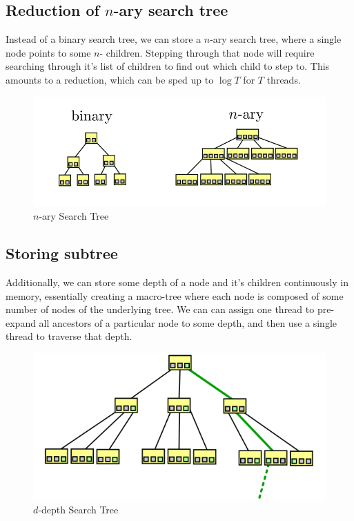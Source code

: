 \subsection{Reduction of $n$-ary search tree}
Instead of a binary search tree, we can store a $n$-ary search tree, where a single node points to some $n$- children. Stepping through that node will require searching through it's list of children to find out which child to step to. This amounts to a reduction, which can be sped up to $\log T$ for $T$ threads. 

\begin{figure}[H]
\begin{centering}
    \includegraphics[scale=1]{fig/nary_search_tree}
    \caption{$n$-ary Search Tree}
    \label{fig:nary_tree}
\end{centering}
\end{figure}

\subsection{Storing subtree}
Additionally, we can store some depth of a node and it's children continuously in memory, essentially creating a macro-tree where each node is composed of some number of nodes of the underlying tree. We can can assign one thread to pre-expand all ancestors of a particular node to some depth, and then use a single thread to traverse that depth.

 \begin{figure}[H]
\begin{centering}
    \includegraphics[scale=1]{fig/ddepth_macro_tree}
    \caption{$d$-depth Search Tree}
    \label{fig:ddepth_tree}
\end{centering}
\end{figure}

